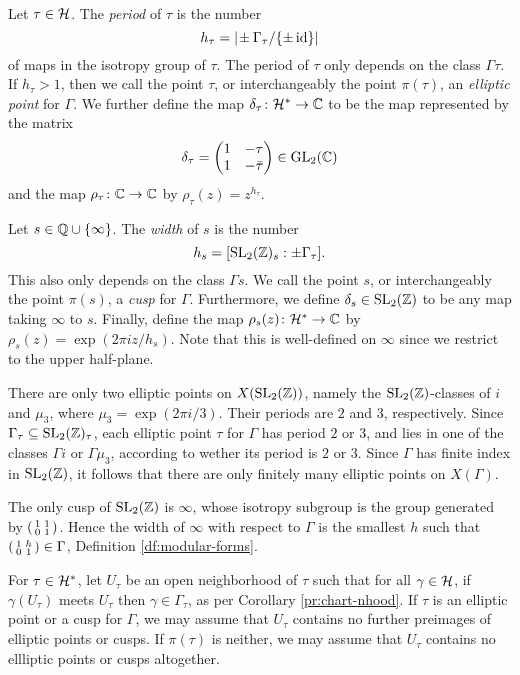 \begin{defi} \

  Let $\tau\in\mathcal{H}$. The \emph{period} of $\tau$ is the number \[h_\tau=|\!\pm\Gamma_\tau/\{\pm\operatorname{id}\}|\] of maps in the isotropy group of $\tau$. The period of $\tau$ only depends on the class $\Gamma\tau$. If $h_\tau > 1$, then we call the point $\tau$, or interchangeably the point $\pi(\tau)$, an \emph{elliptic point} for $\Gamma$. We further define the map $\delta_\tau\colon\mathcal{H}^*\to\mathbb{C}$ to be the map represented by the matrix
 \[\delta_\tau = \begin{pmatrix}1 & -\tau \\ 1 & -\bar{\tau}\end{pmatrix}\in\operatorname{GL}_2(\mathbb{C})\] and the map $\rho_\tau\colon\mathbb{C}\to\mathbb{C}$ by $\rho_\tau(z)=z^{h_\tau}.$
 
  Let $s\in\mathbb{Q}\cup\{\infty\}$. The \emph{width} of $s$ is the number \[h_s=[\operatorname{SL}_2(\mathbb{Z})_s:\pm\Gamma_\tau].\] This also only depends on the class $\Gamma s$. We call the point $s$, or interchangeably the point $\pi(s)$, a \emph{cusp} for $\Gamma$. Furthermore, we define $\delta_s\in\operatorname{SL}_2(\mathbb{Z})$ to be any map taking $\infty$ to $s$. Finally, define the map $\rho_s(z)\colon\mathcal{H}^*\to\mathbb{C}$ by $\rho_s(z)=\exp(2\pi iz/h_s)$. Note that this is well-defined on $\infty$ since we restrict to the upper half-plane.
\end{defi}

\begin{rmk}
 There are only two elliptic points on $X(\operatorname{SL}_2(\mathbb{Z}))$, namely the $\operatorname{SL}_2(\mathbb{Z})$-classes of $i$ and $\mu_3$, where $\mu_3=\exp(2\pi i/3)$. Their periods are $2$ and $3$, respectively. Since $\Gamma_\tau\subseteq\operatorname{SL}_2(\mathbb{Z})_\tau$, each elliptic point $\tau$ for $\Gamma$ has period $2$ or $3$, and lies in one of the classes $\Gamma i$ or $\Gamma \mu_3$, according to wether its period is $2$ or $3$. Since $\Gamma$ has finite index in $\operatorname{SL}_2(\mathbb{Z})$, it follows that there are only finitely many elliptic points on $X(\Gamma)$.
 
 The only cusp of $\operatorname{SL}_2(\mathbb{Z})$ is $\infty$, whose isotropy subgroup is the group generated by $\left(\begin{smallmatrix}1&1\\0&1\end{smallmatrix}\right)$. Hence the width of $\infty$ with respect to $\Gamma$ is the smallest $h$ such that $\left(\begin{smallmatrix}1&h\\0&1\end{smallmatrix}\right)\in\Gamma$, \cf Definition \ref{df:modular-forms}.
\end{rmk}

For $\tau\in\mathcal{H}^*$, let $U_\tau$ be an open neighborhood of $\tau$ such that for all $\gamma\in\mathcal{H}$, if $\gamma(U_\tau)$ meets $U_\tau$ then $\gamma\in\Gamma_\tau$, as per Corollary \ref{pr:chart-nhood}. If $\tau$ is an elliptic point or a cusp for $\Gamma$, we may assume that $U_\tau$ contains no further preimages of elliptic points or cusps. If $\pi(\tau)$ is neither, we may assume that $U_\tau$ contains no ellliptic points or cusps altogether.

